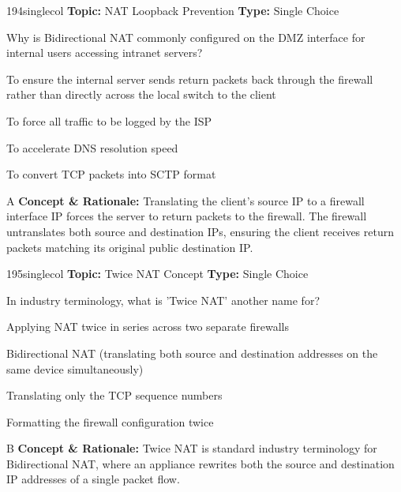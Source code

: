 \begin{qcard}{194}{singlecol}
\textcolor{darkslate!75}{\small\textbf{Topic:} NAT Loopback Prevention \hfill \textbf{Type:} Single Choice}\vspace{0.4em}\par
Why is Bidirectional NAT commonly configured on the DMZ interface for internal users accessing intranet servers?
\begin{qoptions}
\item To ensure the internal server sends return packets back through the firewall rather than directly across the local switch to the client
\item To force all traffic to be logged by the ISP
\item To accelerate DNS resolution speed
\item To convert TCP packets into SCTP format
\end{qoptions}
\end{qcard}
\nopagebreak
\begin{explainbox}{A}
\textbf{Concept \& Rationale:} Translating the client's source IP to a firewall interface IP forces the server to return packets to the firewall. The firewall untranslates both source and destination IPs, ensuring the client receives return packets matching its original public destination IP.
\end{explainbox}

\begin{qcard}{195}{singlecol}
\textcolor{darkslate!75}{\small\textbf{Topic:} Twice NAT Concept \hfill \textbf{Type:} Single Choice}\vspace{0.4em}\par
In industry terminology, what is 'Twice NAT' another name for?
\begin{qoptions}
\item Applying NAT twice in series across two separate firewalls
\item Bidirectional NAT (translating both source and destination addresses on the same device simultaneously)
\item Translating only the TCP sequence numbers
\item Formatting the firewall configuration twice
\end{qoptions}
\end{qcard}
\nopagebreak
\begin{explainbox}{B}
\textbf{Concept \& Rationale:} Twice NAT is standard industry terminology for Bidirectional NAT, where an appliance rewrites both the source and destination IP addresses of a single packet flow.
\end{explainbox}

